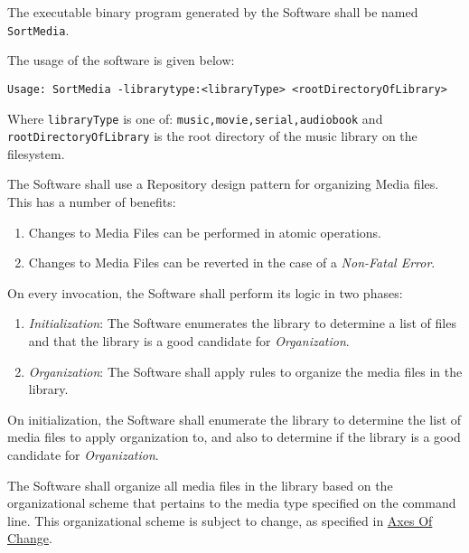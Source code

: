 \documentclass{designdoc}
\begin{document}
The executable binary program generated by the Software shall be named
\texttt{SortMedia}.

The usage of the software is given below:

\begin{verbatim}
Usage: SortMedia -librarytype:<libraryType> <rootDirectoryOfLibrary>
\end{verbatim}

Where \texttt{libraryType} is one of: \texttt{music,movie,serial,audiobook} and
\texttt{rootDirectoryOfLibrary} is the root directory of the music library on
the filesystem.

The Software shall use a Repository design pattern for organizing Media files.
This has a number of benefits:
\begin{enumerate}
\item Changes to Media Files can be performed in atomic operations.
\item Changes to Media Files can be reverted in the case of a
  \textit{Non-Fatal Error}.
\end{enumerate}

On every invocation, the Software shall perform its logic in two phases:
\begin{enumerate}
\item \textit{Initialization}: The Software enumerates the library to determine
  a list of files and that the library is a good candidate for
  \textit{Organization}.
\item \textit{Organization}: The Software shall apply rules to organize the
  media files in the library.
\end{enumerate}

On initialization, the Software shall enumerate the library to determine the
list of media files to apply organization to, and also to determine if the
library is a good candidate for \textit{Organization}.

The Software shall organize all media files in the library based on the
organizational scheme that pertains to the media type specified on the command
line. This organizational scheme is subject to change, as specified in
\hyperlink{sec:axesOfChange}{Axes Of Change}.
\end{document}
